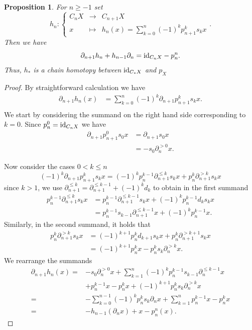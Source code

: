 \documentclass[12pt]{amsart}
\theoremstyle{plain}
\numberwithin{lemma}{\DefaultNumberTheoremWithin}
\numberwithin{claim}{\DefaultNumberTheoremWithin}
\numberwithin{theorem}{\DefaultNumberTheoremWithin}
\numberwithin{corollary}{\DefaultNumberTheoremWithin}
\newtheorem{proposition}{Proposition}
\numberwithin{proposition}{\DefaultNumberTheoremWithin}
\numberwithin{conjecture}{\DefaultNumberTheoremWithin}
\theoremstyle{definition}
\theoremstyle{definition}
\numberwithin{question}{\DefaultNumberTheoremWithin}
\theoremstyle{definition}
\numberwithin{problem}{\DefaultNumberTheoremWithin}
\theoremstyle{remark}
\numberwithin{remark}{\DefaultNumberTheoremWithin}
\theoremstyle{remark}
\numberwithin{example}{\DefaultNumberTheoremWithin}
\def\blt{*}
\def\id{\textnormal{id}}
\newcommand{\del}{\partial}
\newcommand{\argdel}[2]{\del^{#1}_{#2}}
\newcommand{\pmap}[2]{p_{#2}^{#1}}
\begin{document}
\begin{proposition}\label{PropSimpChainHtpy}
    For $n \geq -1$ set
    $$h_n \colon \left\{ \begin{array}{ccc} C_nX & \rightarrow & 
    C_{n+1} X \\ x & \mapsto &h_n(x)=\displaystyle{\sum_{k=0}^n} (-1)^k\pmap{k}{n+1} s_k x\end{array} \right. . $$
    Then we have
    $$\partial_{n+1} h_{n} + h_{n-1}\partial_n = \id_{C_nX} - \pmap{n}{n}.$$
    Thus, $h_\blt$ is a chain homotopy between
    $\id_{C_\blt X}$ and $p_X$
\end{proposition}
\begin{proof}
By straightforward calculation we have
\begin{align*}
    \del_{n+1} h_n(x)&=\sum_{k=0}^n(-1)^k \del_{n+1} \pmap{k}{n+1} s_k x.\\
\end{align*}
We start by considering the summand on the right hand side corresponding to $k=0$. Since $\pmap{0}{n}=\id_{C_n X}$ we have
\begin{align*} \del_{n+1} \pmap{0}{n+1} s_0 x &=\del_{n+1} s_0 x \\
    &=-s_0\argdel{>0}{n} x.
\end{align*}

Now consider the cases $0<k\leq n$
\[
(-1)^k \del_{n+1} \pmap{k}{n+1} s_k x=(-1)^k \pmap{k-1}{n}\argdel{\leq k}{n+1}s_kx+\pmap{k}{n}\argdel{>k}{n+1}s_kx
\]
since $k>1$, we use $\argdel{\leq k}{n+1}=\argdel{\leq k-1}{n+1}+(-1)^kd_k$ to obtain in the first summand
\begin{align*}
    \pmap{k-1}{n}\argdel{\leq k}{n+1}s_kx&=\pmap{k-1}{n}\argdel{\leq k-1}{n+1}s_kx +(-1)^k\pmap{k-1}{n}d_{k}s_kx\\
    &=\pmap{k-1}{n}s_{k-1}\argdel{\leq k-1}{n+1}x +(-1)^k\pmap{k-1}{n}x.
\end{align*}
Similarly, in the second summand, it holds that
\begin{align*}
    \pmap{k}{n}\argdel{>k}{n+1}s_kx &=(-1)^{k+1}\pmap{k}{n}d_{k+1}s_kx+ \pmap{k}{n}\argdel{>k+1}{n+1}s_kx\\
    &=(-1)^{k+1}\pmap{k}{n}x-\pmap{k}{n}s_k\argdel{>k}{n}x.
\end{align*} 
We rearrange the summands
\begin{align*}
    \del_{n+1} h_n(x)= &-s_0\argdel{>0}{n}x+\sum_{k=1}^n(-1)^k\pmap{k-1}{n}s_{k-1}\argdel{\leq k-1}{n}x  \\ &+ \pmap{k-1}{n}x-\pmap{k}{n}x+ (-1)^{k+1}\pmap{k}{n}s_k\argdel{>k}{n}x\\
    =&-\sum_{k=0}^{n-1}(-1)^k \pmap{k}{n}s_k\del_n x+\sum_{k=1}^{n}\pmap{k-1}{n}x-\pmap{k}{n} x\\
    =&-h_{n-1}(\del_n x)+x-\pmap{n}{n}(x).
\end{align*}
\end{proof}
\end{document}
